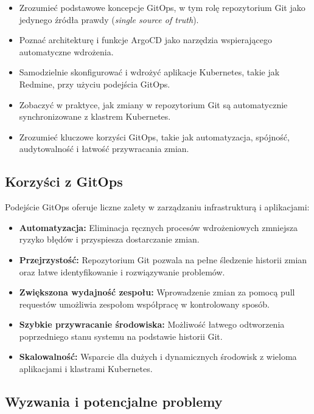 \documentclass{article}
\begin{document}
\begin{itemize}
    \item Zrozumieć podstawowe koncepcje GitOps, w tym rolę repozytorium Git jako jedynego źródła prawdy (\textit{single source of truth}).
    \item Poznać architekturę i funkcje ArgoCD jako narzędzia wspierającego automatyczne wdrożenia.
    \item Samodzielnie skonfigurować i wdrożyć aplikacje Kubernetes, takie jak Redmine, przy użyciu podejścia GitOps.
    \item Zobaczyć w praktyce, jak zmiany w repozytorium Git są automatycznie synchronizowane z klastrem Kubernetes.
    \item Zrozumieć kluczowe korzyści GitOps, takie jak automatyzacja, spójność, audytowalność i łatwość przywracania zmian.
\end{itemize}

\subsection{Korzyści z GitOps}

Podejście GitOps oferuje liczne zalety w zarządzaniu infrastrukturą i aplikacjami:
\begin{itemize}
    \item \textbf{Automatyzacja:} Eliminacja ręcznych procesów wdrożeniowych zmniejsza ryzyko błędów i przyspiesza dostarczanie zmian.
    \item \textbf{Przejrzystość:} Repozytorium Git pozwala na pełne śledzenie historii zmian oraz łatwe identyfikowanie i rozwiązywanie problemów.
    \item \textbf{Zwiększona wydajność zespołu:} Wprowadzenie zmian za pomocą pull requestów umożliwia zespołom współpracę w kontrolowany sposób.
    \item \textbf{Szybkie przywracanie środowiska:} Możliwość łatwego odtworzenia poprzedniego stanu systemu na podstawie historii Git.
    \item \textbf{Skalowalność:} Wsparcie dla dużych i dynamicznych środowisk z wieloma aplikacjami i klastrami Kubernetes.
\end{itemize}

\subsection{Wyzwania i potencjalne problemy}
\end{document}
